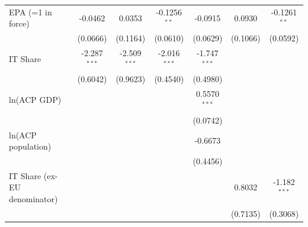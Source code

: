 \begin{tabular}{lcccccc}
   EPA (=1 in force)            & -0.0462                        & 0.0353                           & -0.1256$^{**}$                   & -0.0915                             & 0.0930                                    & -0.1261$^{**}$\\   
                                & (0.0666)                       & (0.1164)                         & (0.0610)                         & (0.0629)                            & (0.1066)                                  & (0.0592)\\   
   IT Share                     & -2.287$^{***}$                 & -2.509$^{***}$                   & -2.016$^{***}$                   & -1.747$^{***}$                      &                                           &   \\   
                                & (0.6042)                       & (0.9623)                         & (0.4540)                         & (0.4980)                            &                                           &   \\   
   ln(ACP GDP)                  &                                &                                  &                                  & 0.5570$^{***}$                      &                                           &   \\   
                                &                                &                                  &                                  & (0.0742)                            &                                           &   \\   
   ln(ACP population)           &                                &                                  &                                  & -0.6673                             &                                           &   \\   
                                &                                &                                  &                                  & (0.4456)                            &                                           &   \\   
   IT Share (ex-EU denominator) &                                &                                  &                                  &                                     & 0.8032                                    & -1.182$^{***}$\\   
                                &                                &                                  &                                  &                                     & (0.7135)                                  & (0.3068)\\   

\end{tabular}
